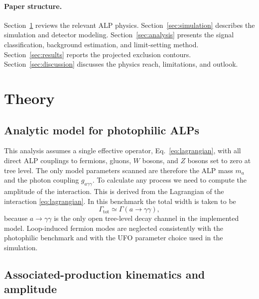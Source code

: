 \documentclass[12pt,a4paper]{article}
\begin{document}
\paragraph{Paper structure.}
Section~\ref{sec:theory} reviews the relevant ALP physics.
Section~\ref{sec:simulation} describes the simulation and detector modeling.
Section~\ref{sec:analysis} presents the signal classification, background
estimation, and limit-setting method.
Section~\ref{sec:results} reports the projected exclusion contours.
Section~\ref{sec:discussion} discusses the physics reach, limitations, and outlook.

\section{Theory}
\label{sec:theory}

\subsection{Analytic model for photophilic ALPs}

This analysis assumes a single effective operator,
Eq.~\eqref{eq:lagrangian}, with all direct ALP couplings to fermions, gluons,
$W$ bosons, and $Z$ bosons set to zero at tree level. The only model
parameters scanned are therefore the ALP mass $m_{a}$ and the photon coupling
$g_{a\gamma\gamma}$. To calculate any process we need to compute the amplitude of the
interaction. This is derived from the Lagrangian of the interaction
\eqref{eq:lagrangian}. In this benchmark the total width is taken to be
\begin{equation}
    \Gamma_\mathrm{tot} \simeq \Gamma(a\to\gamma\gamma),
    \label{eq:width_assumption}
\end{equation}
because $a\to\gamma\gamma$ is the only open tree-level decay channel in the
implemented model. Loop-induced fermion modes are neglected consistently with
the photophilic benchmark and with the UFO parameter choice used in the
simulation.

\subsection{Associated-production kinematics and amplitude}
\end{document}
